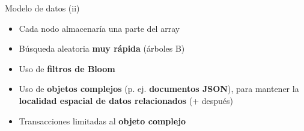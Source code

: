 \documentclass[14pt]{beamer}
\begin{document}
\begin{frame}
\begin{overlayarea}{\textwidth}{.8\textheight}
{\begin{block}{Modelo de datos (ii)}
\begin{itemize}
\begin{itemize}
\item Cada nodo almacenaría una parte del array
\item Búsqueda aleatoria {\bf muy rápida} (árboles B)
\item Uso de {\bf filtros de Bloom}
\item Uso de {\bf objetos complejos} (p. ej. {\bf documentos JSON}),
  para mantener la {\bf localidad espacial de datos relacionados} (+
  después)
\item Transacciones limitadas al {\bf objeto complejo}
\end{itemize}
\end{itemize}
\end{block}%
}%
\end{overlayarea}
\end{frame}
\end{document}
